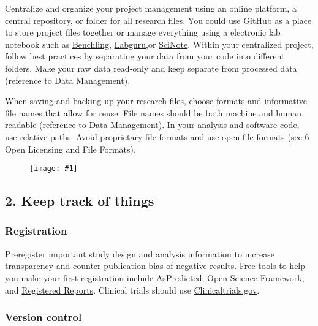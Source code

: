 \documentclass{article}
\newlength{\imgwidth}
\newcommand\scaledgraphics[2]{%
                
\settowidth{\imgwidth}{\texttt{[image: \#1]}}%
                
\setlength{\imgwidth}{\minof{\imgwidth}{#2\textwidth}}%
                
\texttt{[image: \#1]}%
                
}
\begin{document}
Centralize and organize your project management using an online platform, a central repository, or folder for all research files. You could use GitHub as a place to store project files together or manage everything using a electronic lab notebook such as \href{https://benchling.com/}{Benchling}, \href{https://www.labguru.com/}{Labguru},or \href{https://scinote.net/}{SciNote}. Within your centralized project, follow best practices by separating your data from your code into different folders. Make your raw data read-only and keep separate from processed data (reference to Data Management).


When saving and backing up your research files, choose formats and informative file names that allow for reuse. File names should be both machine and human readable (reference to Data Management). In your analysis and software code, use relative paths. Avoid proprietary file formats and use open file formats (see 6 Open Licensing and File Formats).

\begin{figure}
\scaledgraphics{04fbcc59-de6d-400c-ae98-250e796e3621.png}{1}
\label{F27277281}
\end{figure}


\subsection{\textbf{2. Keep track of things}}\label{2-keep-track-of-things}



\subsubsection{Registration}\label{registration}



Preregister important study design and analysis information to increase transparency and counter publication bias of negative results. Free tools to help you make your first registration include \href{https://aspredicted.org/}{AsPredicted}, \href{https://osf.io/}{Open Science Framework}, and \href{https://cos.io/rr/}{Registered Reports}. Clinical trials should use \href{https://clinicaltrials.gov/}{Clinicaltrials.gov}.


\subsubsection{Version control}\label{version-control}
\end{document}
